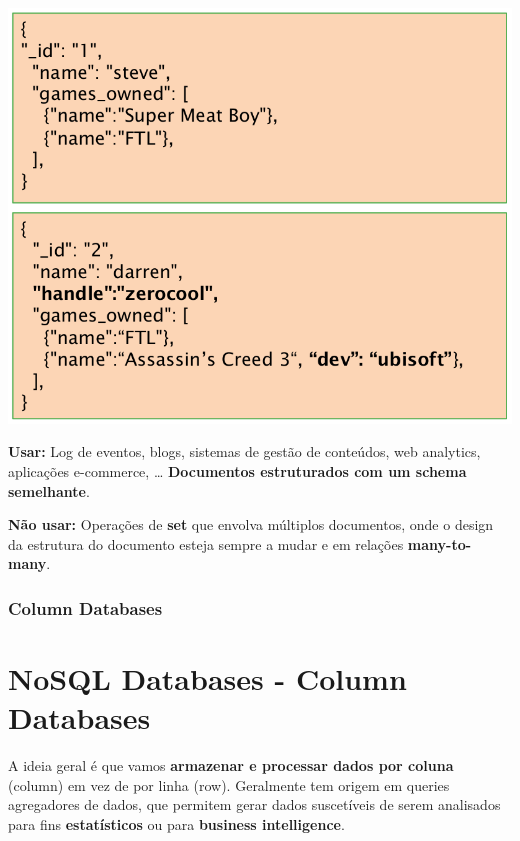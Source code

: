 \documentclass{article}
\begin{document}
\begin{center}
  \includegraphics[scale=0.2]{9}
\end{center}

\begin{flushleft}
  \textbf{Usar:} Log de eventos, blogs, sistemas de gestão de conteúdos,
  web analytics, aplicações e-commerce, \dots
  \textbf{Documentos estruturados com um schema semelhante}.

  \textbf{Não usar:} Operações de \textbf{set} que envolva múltiplos documentos,
  onde o design da estrutura do documento esteja sempre a mudar e
  em relações \textbf{many-to-many}.
\end{flushleft}

\subsubsection{Column Databases}








\pagebreak
\section{NoSQL Databases - Column Databases}

A ideia geral é que vamos \textbf{armazenar e processar dados por coluna} (column) em vez de por linha
(row). Geralmente tem origem em queries agregadores de dados, que permitem gerar
dados suscetíveis de serem analisados para fins \textbf{estatísticos} ou para \textbf{business intelligence}.
\end{document}
